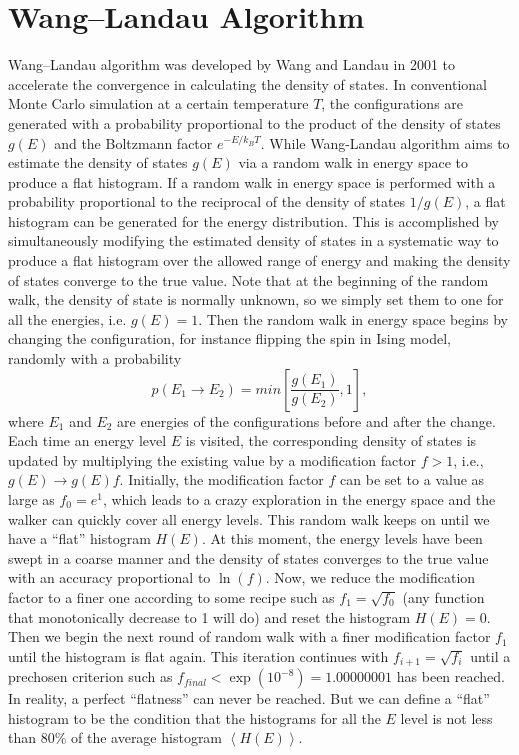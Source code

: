 \section{Wang--Landau Algorithm\label{Sec:ES:Wang--Landau}}
Wang--Landau algorithm was developed by Wang and Landau in 2001 to accelerate the convergence in calculating the density of states.\cite{WangPRL2001} In conventional Monte Carlo simulation at a certain temperature $T$, the configurations are generated with a probability proportional to the product of the density of states $g(E)$ and the Boltzmann factor $e^{-E/k_BT}$. While Wang-Landau algorithm aims to estimate the density of states $g(E)$ via a random walk in energy space to produce a flat histogram. If a random walk in energy space is performed with a probability proportional to the reciprocal of the density of states $1/g(E)$, a flat histogram can be generated for the energy distribution. This is accomplished by simultaneously modifying the estimated density of states in a systematic way to produce a flat histogram over the allowed range of energy and making the density of states converge to the true value. Note that at the beginning of the random walk, the density of state is normally unknown, so we simply set them to one for all the energies, i.e. $g(E)=1$. Then the random walk in energy space begins by changing the configuration, for instance flipping the spin in Ising model, randomly with a probability
\begin{equation}
    p(E_1\to E_2)=min\left[\frac{g(E_1)}{g(E_2)},1\right],
\end{equation}
where $E_1$ and $E_2$ are energies of the configurations before and after the change. Each time an energy level $E$ is visited, the corresponding density of states is updated by multiplying the existing value by a modification factor $f>1$, i.e., $g(E)\to g(E)f$. Initially, the modification factor $f$ can be set to a value as large as $f_0=e^1$, which leads to a crazy exploration in the energy space and the walker can quickly cover all energy levels. This random walk keeps on until we have a ``flat'' histogram $H(E)$. At this moment, the energy levels have been swept in a coarse manner and the density of states converges to the true value with an accuracy proportional to $\ln{(f)}$. Now, we reduce the modification factor to a finer one according to some recipe such as $f_1=\sqrt{f_0}$ (any function that monotonically decrease to 1 will do) and reset the histogram $H(E)=0$. Then we begin the next round of random walk with a finer modification factor $f_1$ until the histogram is flat again. This iteration continues with $f_{i+1}=\sqrt{f_i}$ until a prechosen criterion such as $f_{final}<\exp(10^{-8})=1.00000001$ has been reached. In reality, a perfect ``flatness'' can never be reached. But we can define a ``flat'' histogram to be the condition that the histograms for all the $E$ level is not less than 80\% of the average histogram $\left<H(E)\right>$.

